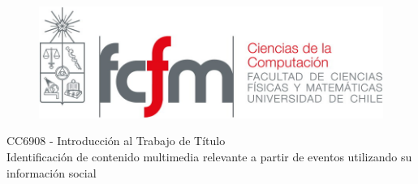 \documentclass[11pt]{article}
\title{}
\author{}
\date{}
\begin{document}
\begin{titlepage}
\begin{figure}[t]
\includegraphics[scale=0.35]{./img/FCFM.jpg}

\end{figure}

\vspace*{0.2 in}

\begin{center}
\Large CC6908 - Introducción al Trabajo de Título \\

\LARGE Identificación de contenido multimedia relevante a partir de eventos utilizando su información social


\end{center}
\end{titlepage}
\end{document}
